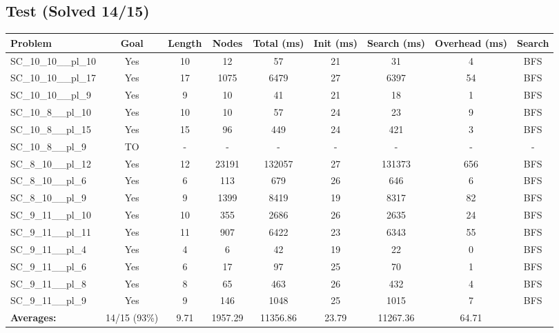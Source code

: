 \documentclass{article}
\begin{document}
\subsection*{Test (Solved 14/15)}
\begin{tabular}{lcccccccc}
\toprule
Problem & Goal & Length & Nodes & Total (ms) & Init (ms) & Search (ms) & Overhead (ms) & Search \\
\midrule
SC\_10\_10\_\_pl\_10 & Yes & 10 & 12 & 57 & 21 & 31 & 4 & BFS \\
SC\_10\_10\_\_pl\_17 & Yes & 17 & 1075 & 6479 & 27 & 6397 & 54 & BFS \\
SC\_10\_10\_\_pl\_9 & Yes & 9 & 10 & 41 & 21 & 18 & 1 & BFS \\
SC\_10\_8\_\_pl\_10 & Yes & 10 & 10 & 57 & 24 & 23 & 9 & BFS \\
SC\_10\_8\_\_pl\_15 & Yes & 15 & 96 & 449 & 24 & 421 & 3 & BFS \\
SC\_10\_8\_\_pl\_9 & TO & - & - & - & - & - & - & - \\
SC\_8\_10\_\_pl\_12 & Yes & 12 & 23191 & 132057 & 27 & 131373 & 656 & BFS \\
SC\_8\_10\_\_pl\_6 & Yes & 6 & 113 & 679 & 26 & 646 & 6 & BFS \\
SC\_8\_10\_\_pl\_9 & Yes & 9 & 1399 & 8419 & 19 & 8317 & 82 & BFS \\
SC\_9\_11\_\_pl\_10 & Yes & 10 & 355 & 2686 & 26 & 2635 & 24 & BFS \\
SC\_9\_11\_\_pl\_11 & Yes & 11 & 907 & 6422 & 23 & 6343 & 55 & BFS \\
SC\_9\_11\_\_pl\_4 & Yes & 4 & 6 & 42 & 19 & 22 & 0 & BFS \\
SC\_9\_11\_\_pl\_6 & Yes & 6 & 17 & 97 & 25 & 70 & 1 & BFS \\
SC\_9\_11\_\_pl\_8 & Yes & 8 & 65 & 463 & 26 & 432 & 4 & BFS \\
SC\_9\_11\_\_pl\_9 & Yes & 9 & 146 & 1048 & 25 & 1015 & 7 & BFS \\
\textbf{Averages:} & 14/15 (93\%) & 9.71 & 1957.29 & 11356.86 & 23.79 & 11267.36 & 64.71 & \\
\bottomrule
\end{tabular}
\\[0.7cm]
\end{document}
